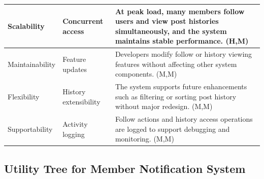 \documentclass{article}
\begin{document}
\begin{table}[H]
\begin{tabular}{|p{3cm}|p{4cm}|p{7cm}|}
Scalability
& Concurrent access
& At peak load, many members follow users and view post histories simultaneously, and the system maintains stable performance. (H,M) \\
\hline

Maintainability
& Feature updates
& Developers modify follow or history viewing features without affecting other system components. (M,M) \\
\hline

Flexibility
& History extensibility
& The system supports future enhancements such as filtering or sorting post history without major redesign. (M,M) \\
\hline

Supportability
& Activity logging
& Follow actions and history access operations are logged to support debugging and monitoring. (M,M) \\
\hline

\end{tabular}
\end{table}

\subsection{Utility Tree for Member Notification System}
\end{document}

